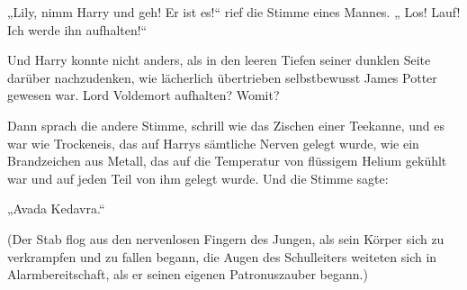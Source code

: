 \begin{em}
„Lily, nimm Harry und geh! Er ist es!“ rief die Stimme eines Mannes. „ Los! Lauf! Ich werde ihn aufhalten!“

Und Harry konnte nicht anders, als in den leeren Tiefen seiner dunklen Seite darüber nachzudenken, wie lächerlich übertrieben selbstbewusst James Potter gewesen war. Lord Voldemort aufhalten? Womit?

Dann sprach die andere Stimme, schrill wie das Zischen einer Teekanne, und es war wie Trockeneis, das auf Harrys sämtliche Nerven gelegt wurde, wie ein Brandzeichen aus Metall, das auf die Temperatur von flüssigem Helium gekühlt war und auf jeden Teil von ihm gelegt wurde. Und die Stimme sagte:

„Avada Kedavra.“
\end{em}

(Der Stab flog aus den nervenlosen Fingern des Jungen, als sein Körper sich zu verkrampfen und zu fallen begann, die Augen des Schulleiters weiteten sich in Alarmbereitschaft, als er seinen eigenen Patronuszauber begann.)

